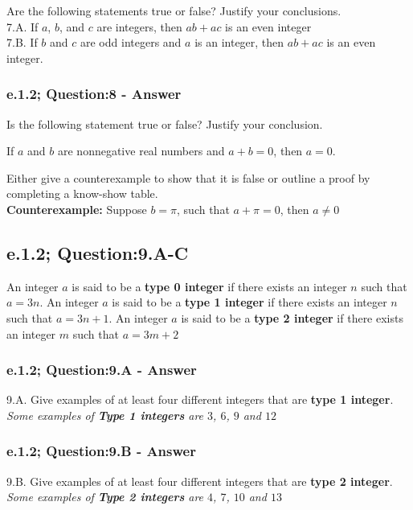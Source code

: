 Are the following statements true or false? Justify your conclusions. \\

7.A. If $a$, $b$, and $c$ are integers, then $ab + ac$ is an even integer \\
7.B. If $b$ and $c$ are odd integers and $a$ is an integer, then $ab + ac$ is an even integer. \\

\subsubsection*{e.1.2; Question:8 - Answer}

Is the following statement true or false? Justify your conclusion. \\

\begin{center}
If $a$ and $b$ are nonnegative real numbers and $a + b = 0$, then $a=0$.
\end{center}
Either give a counterexample to show that it is false or outline a proof by completing a know-show table. \\

{\bf Counterexample:} Suppose $b = \pi$, such that $a + \pi = 0$, then $a \neq 0$

\subsection{e.1.2; Question:9.A-C}
An integer $a$ is said to be a {\bf type 0 integer} if there exists an integer $n$ such that $a = 3n$. An integer $a$ is said to be a {\bf type 1 integer} if there exists an integer $n$ such that $a = 3n +1$. An integer $a$ is said to be a {\bf type 2 integer} if there exists an integer $m$ such that $a = 3m + 2$ \\

\subsubsection*{e.1.2; Question:9.A - Answer}
9.A. Give examples of at least four different integers that are {\bf type 1 integer}. \\
{\it Some examples of {\bf Type 1 integers} are $3$, $6$, $9$ and $12$} \\

\subsubsection*{e.1.2; Question:9.B - Answer}
9.B. Give examples of at least four different integers that are {\bf type 2 integer}. \\
{\it Some examples of {\bf Type 2 integers} are $4$, $7$, $10$ and $13$} \\

